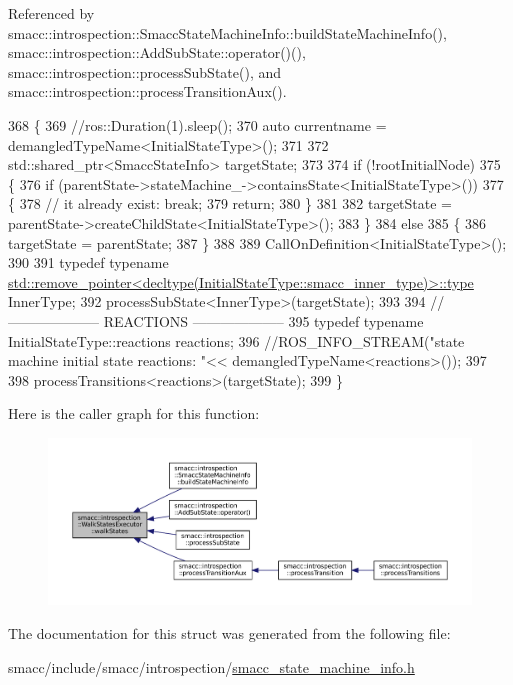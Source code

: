 Referenced by smacc\+::introspection\+::\+Smacc\+State\+Machine\+Info\+::build\+State\+Machine\+Info(), smacc\+::introspection\+::\+Add\+Sub\+State\+::operator()(), smacc\+::introspection\+::process\+Sub\+State(), and smacc\+::introspection\+::process\+Transition\+Aux().


\begin{DoxyCode}
368 \{
369     \textcolor{comment}{//ros::Duration(1).sleep();}
370     \textcolor{keyword}{auto} currentname = demangledTypeName<InitialStateType>();
371 
372     std::shared\_ptr<SmaccStateInfo> targetState;
373 
374     \textcolor{keywordflow}{if} (!rootInitialNode)
375     \{
376         \textcolor{keywordflow}{if} (parentState->stateMachine\_->containsState<InitialStateType>())
377         \{
378             \textcolor{comment}{// it already exist: break;}
379             \textcolor{keywordflow}{return};
380         \}
381 
382         targetState = parentState->createChildState<InitialStateType>();
383     \}
384     \textcolor{keywordflow}{else}
385     \{
386         targetState = parentState;
387     \}
388 
389     CallOnDefinition<InitialStateType>();
390 
391     \textcolor{keyword}{typedef} \textcolor{keyword}{typename} 
      \hyperlink{namespacegenerate__debs_a50bc9a7ecac9584553e089a448bcde58}{std::remove\_pointer<decltype(InitialStateType::smacc\_inner\_type)>::type}
       InnerType;
392     processSubState<InnerType>(targetState);
393 
394     \textcolor{comment}{// -------------------- REACTIONS --------------------}
395     \textcolor{keyword}{typedef} \textcolor{keyword}{typename} InitialStateType::reactions reactions;
396     \textcolor{comment}{//ROS\_INFO\_STREAM("state machine initial state reactions: "<< demangledTypeName<reactions>());}
397 
398     processTransitions<reactions>(targetState);
399 \}
\end{DoxyCode}
Here is the caller graph for this function\+:
\nopagebreak
\begin{figure}[H]
\begin{center}
\leavevmode
\includegraphics[width=350pt]{structsmacc_1_1introspection_1_1WalkStatesExecutor_a21848ccc6e7a7ddee0ccfff97e550ec6_icgraph}
\end{center}
\end{figure}


The documentation for this struct was generated from the following file\+:\begin{DoxyCompactItemize}
\item 
smacc/include/smacc/introspection/\hyperlink{smacc__state__machine__info_8h}{smacc\+\_\+state\+\_\+machine\+\_\+info.\+h}\end{DoxyCompactItemize}
